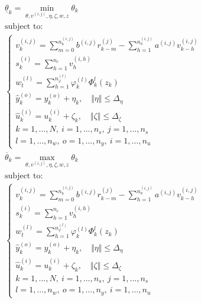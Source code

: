 \begin{multicols}{2}
    \noindent
    \begin{equation}\begin{aligned}
            &\underline{\theta}_k = \min_{\theta,v^{(i,j)},\eta,\zeta,w,z} \theta_k \\
            &\text{subject to:}\\
            &\begin{cases}
                v_k^{(i,j)}=\sum_{m=0}^{n_b^{(i,j)}} {
                b^{(i,j)} r_{k-m}^{(j)} 
            } - \sum_{h=1}^{n_a^{(i,j)}} {
                a^{(i,j)} v_{k-h}^{(i,j)} }\\
            s_k^{(i)}=\sum_{h=1}^{n_r}{v_h^{(i,h)}} \\
            w_t^{(l)}=\sum_{h=1}^{n_{\varphi}^{(l)}}{
                \varphi_k^{(l)} \varPhi_k^l(z_k)}\\
            \hat{y}_k^{(o)}=y_k^{(o)}+\eta_k, \quad 
            \Vert \eta \Vert \le \Delta_\eta\\
            \hat{u}_k^{(i)}=u_k^{(i)}+\zeta_k, \quad 
            \Vert \zeta \Vert \le \Delta_\zeta\\
            k=1,...,N, \ i=1,...,n_s, \ j=1,...,n_s \\
            l=1,...,n_w, \ o=1,...,n_y, \ i=1,...,n_u
            \end{cases}
        \end{aligned}
    \end{equation}
    \begin{equation}
        \begin{aligned}
            &\overline{\theta}_k = \max_{\theta,v^{(i,j)},\eta,\zeta,w,z} \theta_k \\
            &\text{subject to:}\\
            &\begin{cases}
                v_k^{(i,j)}=\sum_{m=0}^{n_b^{(i,j)}} {
                b^{(i,j)} r_{k-m}^{(j)} 
            } - \sum_{h=1}^{n_a^{(i,j)}} {
                a^{(i,j)} v_{k-h}^{(i,j)} }\\
            s_k^{(i)}=\sum_{h=1}^{n_r}{v_h^{(i,h)}} \\
            w_t^{(l)}=\sum_{h=1}^{n_{\varphi}^{(l)}}{
                \varphi_k^{(l)} \varPhi_k^l(z_k)}\\
            \hat{y}_k^{(o)}=y_k^{(o)}+\eta_k, \quad 
            \Vert \eta \Vert \le \Delta_\eta\\
            \hat{u}_k^{(i)}=u_k^{(i)}+\zeta_k, \quad 
            \Vert \zeta \Vert \le \Delta_\zeta\\
            k=1,...,N, \ i=1,...,n_s, \ j=1,...,n_s \\
            l=1,...,n_w, \ o=1,...,n_y, \ i=1,...,n_u
            \end{cases}
        \end{aligned}
    \end{equation}
\end{multicols}
